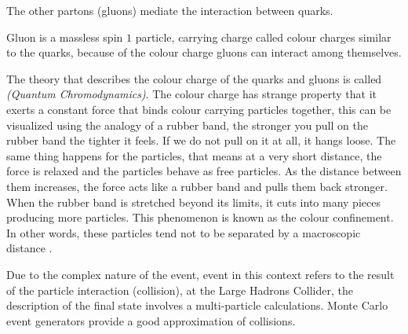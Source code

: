 The other partons (gluons)  mediate the interaction between quarks. 

Gluon is a massless spin $1$ particle, carrying charge called colour charges similar to the quarks, because  of the colour charge gluons can interact among themselves.

The theory that describes the colour charge of the quarks and gluons is called \emph{(Quantum Chromodynamics)}. The colour charge has strange property that it exerts a constant force that binds colour carrying particles together, this can be visualized using the analogy of a rubber band, the stronger you pull on the rubber band the tighter it feels.
If we do not pull on it at all, it hangs loose. The same thing happens for the particles,  that means at a very short distance, the force is relaxed and the particles behave as free particles. As the distance between them increases, the force acts like a rubber band and pulls them back stronger. When the rubber band is stretched beyond its limits, it cuts into many pieces producing more particles. This phenomenon is known as the colour confinement. In other words, these particles tend not to be separated by a macroscopic distance
 \citep{particle}.

Due to the complex nature of the event, event in this context refers to the result of the particle interaction (collision), at the Large Hadrons Collider, the description of the final state involves a multi-particle calculations. Monte Carlo event generators provide a good approximation of collisions.\label{sec}

